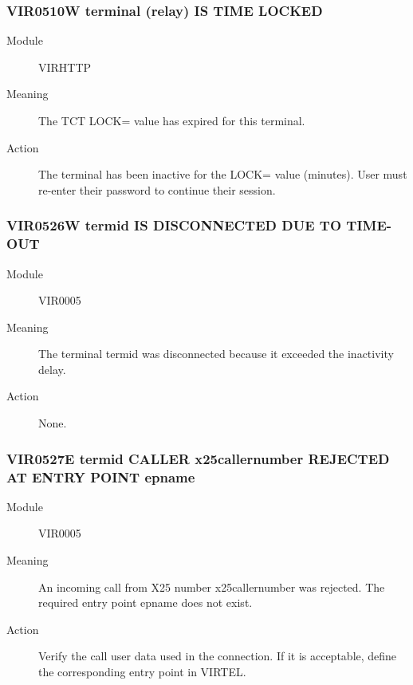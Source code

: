 \documentclass[letterpaper,10pt,english]{sphinxmanual}
\begin{document}
\subsubsection{VIR0510W terminal (relay) IS TIME LOCKED}
\label{\detokenize{messages:vir0510w-terminal-relay-is-time-locked}}\begin{description}
\item[{Module}] \leavevmode
VIRHTTP

\item[{Meaning}] \leavevmode
The TCT LOCK= value has expired for this terminal.

\item[{Action}] \leavevmode
The terminal has been inactive for the LOCK= value (minutes). User must re-enter their password to continue their session.

\end{description}


\subsubsection{VIR0526W termid IS DISCONNECTED DUE TO TIME-OUT}
\label{\detokenize{messages:vir0526w-termid-is-disconnected-due-to-time-out}}\begin{description}
\item[{Module}] \leavevmode
VIR0005

\item[{Meaning}] \leavevmode
The terminal termid was disconnected because it exceeded the inactivity delay.

\item[{Action}] \leavevmode
None.

\end{description}


\subsubsection{VIR0527E termid CALLER x25callernumber REJECTED AT ENTRY POINT epname}
\label{\detokenize{messages:vir0527e-termid-caller-x25callernumber-rejected-at-entry-point-epname}}\begin{description}
\item[{Module}] \leavevmode
VIR0005

\item[{Meaning}] \leavevmode
An incoming call from X25 number x25callernumber was rejected. The required entry point epname does not exist.

\item[{Action}] \leavevmode
Verify the call user data used in the connection. If it is acceptable, define the corresponding entry point in VIRTEL.

\end{description}
\end{document}
